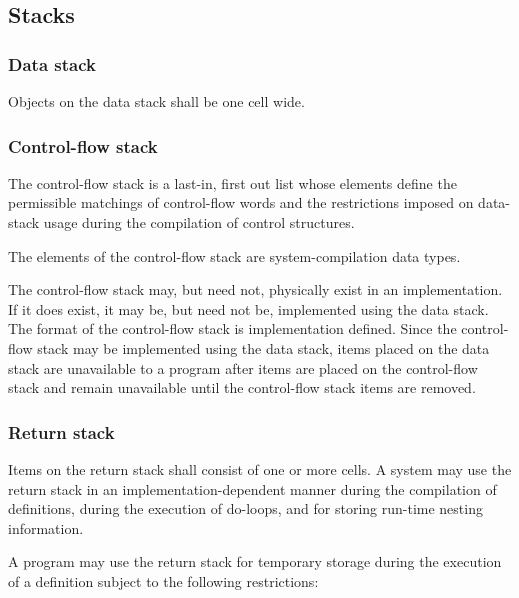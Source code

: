 \subsection{Stacks} %

\subsubsection{Data stack} %
\label{usage:datastack}

Objects on the data stack shall be one cell wide.

\subsubsection{Control-flow stack} %
\label{usage:controlstack}

The control-flow stack is a last-in, first out list whose elements
define the permissible matchings of control-flow words and the
restrictions imposed on data-stack usage during the compilation of
control structures.

The elements of the control-flow stack are system-compilation data
types.

The control-flow stack may, but need not, physically exist in an
implementation. If it does exist, it may be, but need not be,
implemented using the data stack. The format of the control-flow
stack is implementation defined. Since the control-flow stack may
be implemented using the data stack, items placed on the data stack
are unavailable to a program after items are placed on the
control-flow stack and remain unavailable until the control-flow
stack items are removed.

\subsubsection{Return stack} %
\label{usage:returnstack}

Items on the return stack shall consist of one or more cells. A
system may use the return stack in an implementation-dependent
manner during the compilation of definitions, during the execution
of do-loops, and for storing run-time nesting information.

A program may use the return stack for temporary storage during the
execution of a definition subject to the following restrictions:

